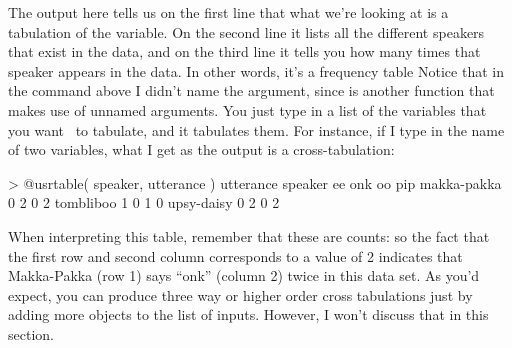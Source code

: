 The output here tells us on the first line that what we're looking at is a tabulation of the  variable. On the second line it lists all the different speakers that exist in the data, and on the third line it tells you how many times that speaker appears in the data. In other words, it's a frequency table Notice that in the command above I didn't name the argument, since  is another function that makes use of unnamed arguments. You just type in a list of the variables that you want \R\ to tabulate, and it tabulates them. For instance, if I type in the name of two variables, what I get as the output is a cross-tabulation:
\begin{rblock1}
> @usr{table( speaker, utterance )}
             utterance
speaker       ee onk oo pip
  makka-pakka  0   2  0   2
  tombliboo    1   0  1   0
  upsy-daisy   0   2  0   2
\end{rblock1}
When interpreting this table, remember that these are counts: so the fact that the first row and second column corresponds to a value of 2 indicates that Makka-Pakka (row 1) says ``onk'' (column 2) twice in this data set. As you'd expect, you can produce three way or higher order cross tabulations just by adding more objects to the list of inputs. However, I won't discuss that in this section.



